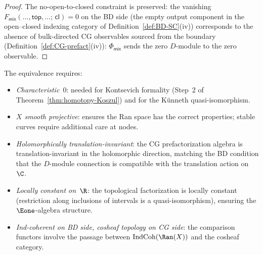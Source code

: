 \begin{proof}
The no-open-to-closed constraint is preserved: the vanishing
$F_{\mathsf{mix}}(\ldots,\mathsf{top},\ldots;\,\mathsf{cl}) = 0$
on the BD side (the empty output component in the open--closed
indexing category of Definition~\ref{def:BD-SC}(iv)) corresponds to
the absence of bulk-directed CG observables sourced from the boundary
(Definition~\ref{def:CG-prefact}(iv)): $\Phi_{\mathsf{mix}}$
sends the zero $D$-module to the zero observable.
\end{proof}

\begin{remark}
\label{rem:BD-CG-adjectives}
The equivalence requires:
\begin{itemize}
\item \emph{Characteristic~$0$}: needed for Kontsevich formality
 (Step~2 of Theorem~\ref{thm:homotopy-Koszul}) and for the
 K\"unneth quasi-isomorphism.
\item \emph{$X$ smooth projective}: ensures the Ran space has the
 correct properties; stable curves require additional care at
 nodes.
\item \emph{Holomorphically translation-invariant}: the CG
 prefactorization algebra is translation-invariant in the
 holomorphic direction, matching the BD condition that the
 $D$-module connection is compatible with the translation action
 on~$\C$.
\item \emph{Locally constant on~$\R$}: the topological
 factorization is locally constant (restriction along inclusions
 of intervals is a quasi-isomorphism), ensuring the
 $\Eone$-algebra structure.
\item \emph{Ind-coherent on BD side, cosheaf topology on CG side}:
 the comparison functors involve the passage between
 $\IndCoh(\Ran(X))$ and the cosheaf category.
\end{itemize}
\end{remark}

